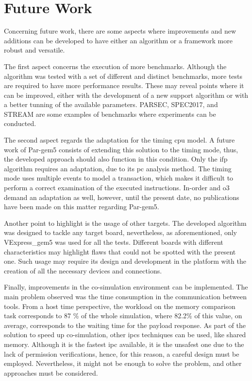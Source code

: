 \section{Future Work}

Concerning future work, there are some aspects where improvements and new additions can be developed to have either an 
algorithm or a framework more robust and versatile.

The first aspect concerns the execution of more benchmarks. Although the algorithm was tested with a set of different and distinct benchmarks, 
more tests are required to have more performance results. These may reveal points where it can be improved, either with the development
of a new support algorithm or with a better tunning of the available parameters. PARSEC, SPEC2017, and STREAM are some examples of 
benchmarks where experiments can be conducted. 

The second aspect regards the adaptation for the timing \gls{cpu} model. A future work of Par-gem5 \cite{pargem5} consists of extending this solution 
to the timing mode, thus, the developed approach should also function in this condition. Only the \gls{ifp} algorithm requires an 
adaptation, due to its \gls{pc} analysis method. The timing mode uses multiple events to model a transaction, which makes it difficult
to perform a correct examination of the executed instructions. In-order and \gls{o3} demand an adaptation as well, however, until 
the present date, no publications have been made on this matter regarding Par-gem5.

Another point to highlight is the usage of other targets. The developed algorithm was designed to tackle any target board, nevertheless, as 
aforementioned, only VExpress\_gem5 was used for all the tests. Different boards with different characteristics may highlight flaws
that could not be spotted with the present one. Such usage may require its design and development in the platform 
with the creation of all the necessary devices and connections. 

Finally, improvements in the co-simulation environment can be implemented. The main problem observed was the time consumption in the 
communication between tools. From a host time perspective, the workload on the memory comparison task corresponds to 87 \% of the 
whole simulation, where 82.2\% of this value, on average, corresponds to the waiting time for the payload response. As part of the solution
to speed up co-simulation, other \glspl*{ipc} techniques can be used, like shared memory. Although it is the 
fastest \gls{ipc} available, it is the unsafest one due to the lack of permission verifications, hence, for this reason, a careful 
design must be employed. Nevertheless, it might not be enough to solve the problem, and other approaches must be considered.
